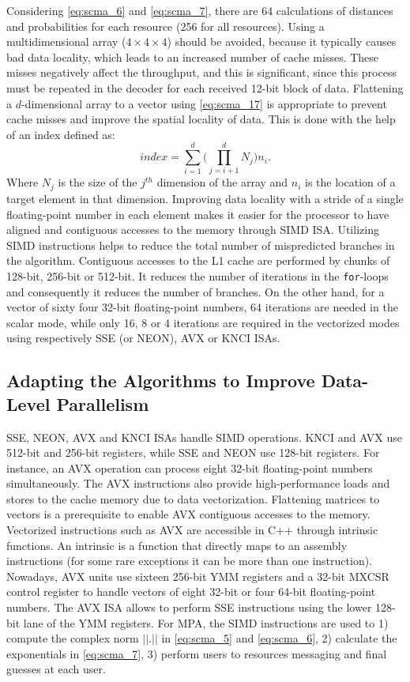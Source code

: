 Considering \eqref{eq:scma_6} and \eqref{eq:scma_7}, there are 64 calculations
of distances and probabilities for each resource (256 for all resources). Using
a multidimensional array ($4\times4\times4$) should be avoided, because it
typically causes bad data locality, which leads to an increased number of cache
misses. These misses negatively affect the throughput, and this is significant,
since this process must be repeated in the decoder for each received 12-bit
block of data. Flattening a $d$-dimensional array to a vector using
\eqref{eq:scma_17} is appropriate to prevent cache misses and improve the
spatial locality of data. This is done with the help of an index defined as:
\begin{equation}
  \label{eq:scma_17}
  index = \sum\limits_{i=1}^d\Bigg( \prod\limits_{j=i+1}^d N_j \Bigg)n_i.
\end{equation}
Where $N_j$ is the size of the $j^{th}$ dimension of the array and $n_i$ is the
location of a target element in that dimension. Improving data locality with
a stride of a single floating-point number in each element makes it easier for
the processor to have aligned and contiguous accesses to the memory through SIMD
ISA. Utilizing SIMD instructions helps to reduce the total number of
mispredicted branches in the algorithm. Contiguous accesses to the L1 cache are
performed by chunks of 128-bit, 256-bit or 512-bit. It reduces the number of
iterations in the \verb|for|-loops and consequently it reduces the number of
branches. On the other hand, for a vector of sixty four 32-bit floating-point
numbers, 64 iterations are needed in the scalar mode, while only 16, 8 or 4
iterations are required in the vectorized modes using respectively SSE (or
NEON), AVX or KNCI ISAs.

\subsection{Adapting the Algorithms to Improve Data-Level Parallelism}
\label{sec:opt_scma_adapting_algorithms}

SSE, NEON, AVX and KNCI ISAs handle SIMD operations. KNCI and AVX use 512-bit
and 256-bit registers, while SSE and NEON use 128-bit registers. For instance,
an AVX operation can process eight 32-bit floating-point numbers simultaneously.
The AVX instructions also provide high-performance loads and stores to the cache
memory due to data vectorization. Flattening matrices to vectors is a
prerequisite to enable AVX contiguous accesses to the memory. Vectorized
instructions such as AVX are accessible in C++ through intrinsic functions. An
intrinsic is a function that directly maps to an assembly instructions (for some
rare exceptions it can be more than one instruction). Nowadays, AVX units use
sixteen 256-bit YMM registers and a 32-bit MXCSR control register to handle
vectors of eight 32-bit or four 64-bit floating-point numbers. The AVX ISA
allows to perform SSE instructions using the lower 128-bit lane of the YMM
registers. For MPA, the SIMD instructions are used to 1) compute the complex
norm $||.||$ in \eqref{eq:scma_5} and \eqref{eq:scma_6}, 2) calculate the
exponentials in \eqref{eq:scma_7}, 3) perform users to resources messaging and
final guesses at each user.


